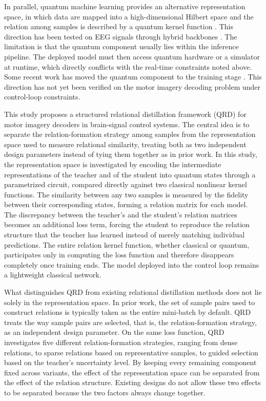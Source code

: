 In parallel, quantum machine learning provides an alternative
representation space, in which data are mapped into a
high-dimensional Hilbert space and the relation among samples is
described by a quantum kernel function \cite{schuld2019quantum}. This
direction has been tested on EEG signals through hybrid backbones
\cite{chen2024qeegnet, chen2026exploring, olvera2024eegbased}. The
limitation is that the quantum component usually lies within the
inference pipeline. The deployed model must then access quantum
hardware or a simulator at runtime, which directly conflicts with the
real-time constraints noted above. Some recent work has moved the
quantum component to the training stage \cite{liu2025quantum,
liu2025quantumtrain}. This direction has not yet been verified on the
motor imagery decoding problem under control-loop constraints.

This study proposes a structured relational distillation framework
(QRD) for motor imagery decoders in brain-signal control systems. The
central idea is to separate the relation-formation strategy among
samples from the representation space used to measure relational
similarity, treating both as two independent design parameters
instead of tying them together as in prior work. In this study, the
representation space is investigated by encoding the intermediate
representations of the teacher and of the student into quantum
states through a parametrized circuit, compared directly against two
classical nonlinear kernel functions. The similarity between any two
samples is measured by the fidelity between their corresponding
states, forming a relation matrix for each model. The discrepancy
between the teacher's and the student's relation matrices becomes an
additional loss term, forcing the student to reproduce the relation
structure that the teacher has learned instead of merely matching
individual predictions. The entire relation kernel function, whether
classical or quantum, participates only in computing the loss
function and therefore disappears completely once training ends. The
model deployed into the control loop remains a lightweight classical
network.

What distinguishes QRD from existing relational distillation methods
does not lie solely in the representation space. In prior work, the
set of sample pairs used to construct relations is typically taken as
the entire mini-batch by default. QRD treats the way sample pairs are
selected, that is, the relation-formation strategy, as an independent
design parameter. On the same loss function, QRD investigates five
different relation-formation strategies, ranging from dense
relations, to sparse relations based on representative samples, to
guided selection based on the teacher's uncertainty level. By keeping
every remaining component fixed across variants, the effect of the
representation space can be separated from the effect of the relation
structure. Existing designs do not allow these two effects to be
separated because the two factors always change together.

